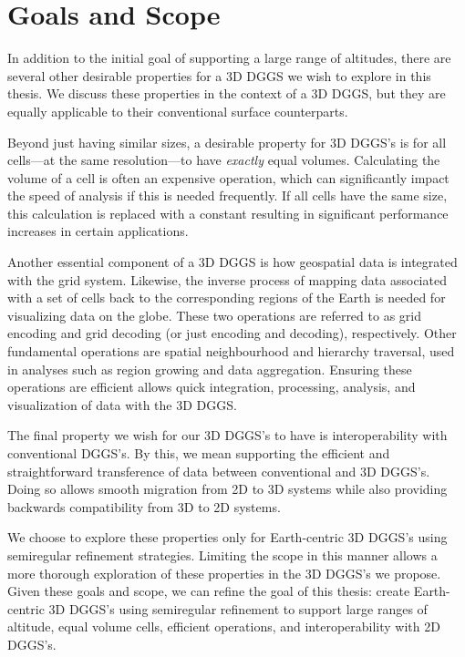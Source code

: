 \section{Goals and Scope}
In addition to the initial goal of supporting a large range of altitudes, there are several other desirable properties for a 3D DGGS we wish to explore in this thesis.
We discuss these properties in the context of a 3D DGGS, but they are equally applicable to their conventional surface counterparts.


Beyond just having similar sizes, a desirable property for 3D DGGS's is for all cells---at the same resolution---to have \textit{exactly} equal volumes.
Calculating the volume of a cell is often an expensive operation, which can significantly impact the speed of analysis if this is needed frequently.
If all cells have the same size, this calculation is replaced with a constant resulting in significant performance increases in certain applications.


Another essential component of a 3D DGGS is how geospatial data is integrated with the grid system.
Likewise, the inverse process of mapping data associated with a set of cells back to the corresponding regions of the Earth is needed for visualizing data on the globe.
These two operations are referred to as grid encoding and grid decoding (or just encoding and decoding), respectively.
Other fundamental operations are spatial neighbourhood and hierarchy traversal, used in analyses such as region growing and data aggregation.
Ensuring these operations are efficient allows quick integration, processing, analysis, and visualization of data with the 3D DGGS.


The final property we wish for our 3D DGGS's to have is interoperability with conventional DGGS's.
By this, we mean supporting the efficient and straightforward transference of data between conventional and 3D DGGS's.
Doing so allows smooth migration from 2D to 3D systems while also providing backwards compatibility from 3D to 2D systems.


We choose to explore these properties only for Earth-centric 3D DGGS's using semiregular refinement strategies.
Limiting the scope in this manner allows a more thorough exploration of these properties in the 3D DGGS's we propose. Given these goals and scope, we can refine the goal of this thesis: create Earth-centric 3D DGGS's using semiregular refinement to support large ranges of altitude, equal volume cells, efficient operations, and interoperability with 2D DGGS's.


